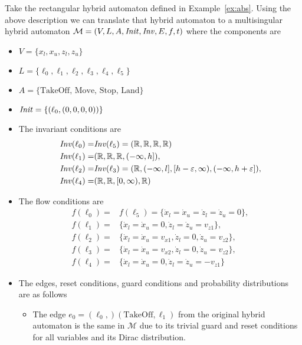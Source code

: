 \begin{ex}
    \label{ex:rect2ms}
Take the rectangular hybrid automaton defined in Example~\ref{ex:abs}. Using the above description we can translate that hybrid automaton to a multisingular hybrid automaton $\mathcal{M}=(V,L,A,\mathit{Init},\mathit{Inv},E,f,t)$ where the components are
\begin{itemize}
    \item $V=\{x_{l},x_{u},z_{l},z_{u}\}$
    \item $L=\{\ell_{0},\ell_{1},\ell_{2},\ell_{3},\ell_{4},\ell_{5}\}$
    \item $A=\{\text{TakeOff, Move, Stop, Land}\}$
    \item $\mathit{Init}=\{(\ell_{0},(0,0,0,0))\}$
    \item The invariant conditions are
    \begin{align*}\mathit{Inv}(\ell_{0})=&\mathit{Inv}(\ell_{5})=(\mathbb{R},\mathbb{R},\mathbb{R},\mathbb{R})\\
        \mathit{Inv}(\ell_{1})=&(\mathbb{R},\mathbb{R},\mathbb{R},(-\infty,h]), \\
        \mathit{Inv}(\ell_{2})=&\mathit{Inv}(\ell_{3})=(\mathbb{R},(-\infty,l],[h-\varepsilon,\infty),(-\infty,h+\varepsilon]), \\
        \mathit{Inv}(\ell_{4})=& (\mathbb{R},\mathbb{R},[0,\infty),\mathbb{R})
    \end{align*}
    \item The flow conditions are
    \begin{align*}
        f(\ell_{0})=&f(\ell_{5})=\{\dot{x}_{l}=\dot{x}_u=\dot{z}_{l}=\dot{z}_{u}=0\},\\
        f(\ell_{1})=&\{\dot{x}_{l}=\dot{x}_{u}=0,\dot{z}_{l}=\dot{z}_{u}=v_{z1}\},\\
        f(\ell_{2})=&\{\dot{x}_{l}=\dot{x}_{u}=v_{x1},\dot{z}_{l}=0,\dot{z}_{u}=v_{z2}\},\\
        f(\ell_{3})=&\{\dot{x}_{l}=\dot{x}_{u}=v_{x2},\dot{z}_{l}=0,\dot{z}_{u}=v_{z2}\},\\
        f(\ell_{4})=&\{\dot{x}_{l}=\dot{x}_{u}=0,\dot{z}_{l}=\dot{z}_{u}=-v_{z1}\}
    \end{align*}
    \item The edges, reset conditions, guard conditions and probability distributions are as follows
    \begin{itemize}
        \item The edge $e_{0}=(\ell_{0},)(\text{TakeOff}, \ell_{1})$ from the original hybrid automaton is the same in $\mathcal{M}$ due to its trivial guard and reset conditions for all variables and its Dirac distribution.

\end{itemize}
\end{itemize}
\end{ex}
